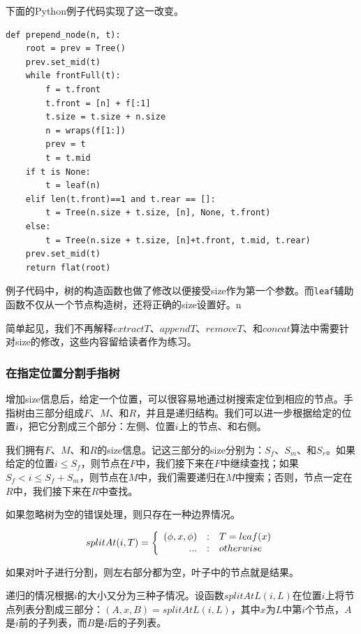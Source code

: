 \documentclass[b5paper]{ctexart}
\begin{document}
下面的Python例子代码实现了这一改变。

\lstset{language=Python}
\begin{lstlisting}
def prepend_node(n, t):
    root = prev = Tree()
    prev.set_mid(t)
    while frontFull(t):
        f = t.front
        t.front = [n] + f[:1]
        t.size = t.size + n.size
        n = wraps(f[1:])
        prev = t
        t = t.mid
    if t is None:
        t = leaf(n)
    elif len(t.front)==1 and t.rear == []:
        t = Tree(n.size + t.size, [n], None, t.front)
    else:
        t = Tree(n.size + t.size, [n]+t.front, t.mid, t.rear)
    prev.set_mid(t)
    return flat(root)
\end{lstlisting}

例子代码中，树的构造函数也做了修改以便接受size作为第一个参数。而\texttt{leaf}辅助函数不仅从一个节点构造树，还将正确的size设置好。n

简单起见，我们不再解释$extractT$、$appendT$、$removeT$、和$concat$算法中需要针对size的修改，这些内容留给读者作为练习。

\subsubsection{在指定位置分割手指树}

增加size信息后，给定一个位置，可以很容易地通过树搜索定位到相应的节点。手指树由三部分组成$F$、$M$、和$R$，并且是递归结构。我们可以进一步根据给定的位置$i$，把它分割成三个部分：左侧、位置$i$上的节点、和右侧。

我们拥有$F$、$M$、和$R$的size信息。记这三部分的size分别为：$S_f$、$S_m$、和$S_r$。如果给定的位置$i \leq S_f$，则节点在$F$中，我们接下来在$F$中继续查找；如果$S_f < i \leq S_f + S_m$，则节点在$M$中，我们需要递归在$M$中搜索；否则，节点一定在$R$中，我们接下来在$R$中查找。

如果忽略树为空的错误处理，则只存在一种边界情况。

\[
splitAt(i, T) = \left \{
  \begin{array}
  {r@{\quad:\quad}l}
  (\phi, x, \phi) & T = leaf(x) \\
  ... & otherwise
  \end{array}
\right .
\]

如果对叶子进行分割，则左右部分都为空，叶子中的节点就是结果。

递归的情况根据$i$的大小又分为三种子情况。设函数$splitAtL(i, L)$在位置$i$上将节点列表分割成三部分：$(A, x, B) = splitAtL(i, L)$，其中$x$为$L$中第$i$个节点，$A$是$i$前的子列表，而$B$是$i$后的子列表。
\end{document}
